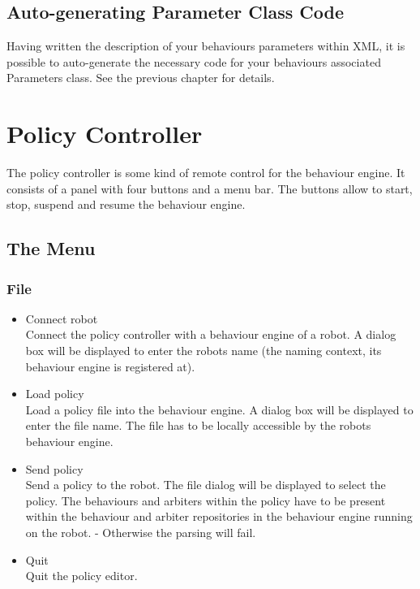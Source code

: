 \subsection{Auto-generating Parameter Class Code}
\label{sec:makeParams}

Having written the description of your behaviours parameters within
XML, it is possible to auto-generate the necessary code for your
behaviours associated Parameters class. See the previous chapter for
details.

\section{Policy Controller}
\label{SEC:POLICY_CONTROLLER}

The policy controller is some kind of remote control for the behaviour
engine. It consists of a panel with four buttons and a menu bar. The
buttons allow to start, stop, suspend and resume the behaviour engine.

\subsection{The Menu}

\subsubsection{File}
\begin{itemize}
\item Connect robot \\
  Connect the policy controller with a behaviour
  engine of a robot. A dialog box will be displayed to enter the
  robots name (the naming context, its behaviour engine is registered
  at).
\item Load policy \\
  Load a policy file into the behaviour engine. A dialog box will be
  displayed to enter the file name. The file has to be locally
  accessible by the robots behaviour engine.
\item Send policy \\
  Send a policy to the robot.  The file dialog will be displayed to
  select the policy. The behaviours and arbiters within the policy
  have to be present within the behaviour and arbiter repositories in
  the behaviour engine running on the robot. - Otherwise the parsing
  will fail.
\item Quit \\
  Quit the policy editor.
\end{itemize}

